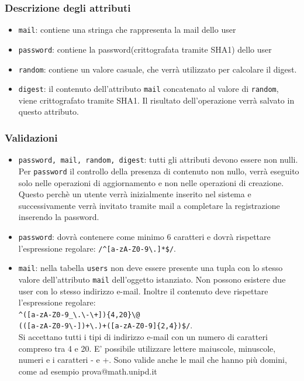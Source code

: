 \documentclass[11pt,a4paper]{article}
\begin{document}
\subsubsection*{Descrizione degli attributi}
\begin{itemize}
 \item \verb|mail|: contiene una stringa che rappresenta la mail dello user
 \item \verb|password|: contiene la password(crittografata tramite SHA1) dello user
 \item \verb|random|: contiene un valore casuale, che verrà utilizzato per calcolare il digest.
 \item \verb|digest|: il contenuto dell'attributo \verb|mail| concatenato al valore di \verb|random|, viene crittografato tramite SHA1. Il risultato dell'operazione verrà salvato in questo attributo.
\end{itemize}
\subsubsection*{Validazioni}
\begin{itemize}
\item \verb|password, mail, random, digest|: tutti gli attributi devono essere non nulli. Per \verb|password| il controllo della presenza di contenuto non nullo, verrà eseguito solo nelle operazioni di aggiornamento e non nelle operazioni di creazione. Questo perchè un utente verrà inizialmente inserito nel sistema e successivamente verrà invitato tramite mail a completare la registrazione inserendo la password.
\item \verb|password|: dovrà contenere come minimo 6 caratteri e dovrà rispettare l'espressione regolare: \verb|/^[a-zA-Z0-9\.]*$/|.
 \item \verb|mail|: nella tabella \verb|users| non deve essere presente una tupla con lo stesso valore dell'attributo \verb|mail| dell'oggetto istanziato. Non possono esistere due user con lo stesso indirizzo e-mail. Inoltre il contenuto deve rispettare l'espressione regolare:\\
\verb|^([a-zA-Z0-9_\.\-\+]){4,20}\@|\\ \verb|(([a-zA-Z0-9\-])+\.)+([a-zA-Z0-9]{2,4})$/|.\\
Si accettano tutti i tipi di indirizzo e-mail con un numero di caratteri compreso tra 4 e 20. E' possibile utilizzare lettere maiuscole, minuscole, numeri e i caratteri - e +. Sono valide anche le mail che hanno più domini, come ad esempio prova@math.unipd.it
\end{itemize}
\end{document}
